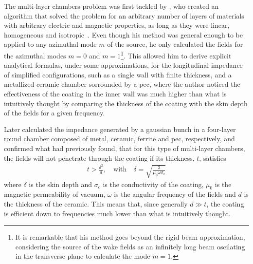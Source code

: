     The multi-layer chambers problem was first tackled by , who created an algorithm that solved the problem for an arbitrary number of layers of materials with arbitrary electric and magnetic properties, as long as they were linear, homogeneous and isotropic~\cite{Zotter1969,Zotter1969a,Zotter1970}. Even though his method was general enough to be applied to any azimuthal mode $m$ of the source, he only calculated the fields for the azimuthal modes $m=0$ and $m=1$\footnote{It is remarkable that his method goes beyond the rigid beam approximation, considering the source of the wake fields as an infinitely long beam oscilating in the transverse plane to calculate the mode $m=1$.}. This allowed him to derive explicit analytical formulas, under some approximations, for the longitudinal impedance of simplified configurations, such as a single wall with finite thickness, and a metallized ceramic chamber sorrounded by a \gls{pec}, where the author noticed the effectiveness of the coating in the inner wall was much higher than what is intuitively thought by comparing the thickness of the coating with the skin depth of the fields for a given frequency.

    Later  calculated the impedance generated by a gaussian bunch in a four-layer round chamber composed of metal, ceramic, ferrite and \gls{pec}, respectively, and confirmed what  had previously found, that for this type of multi-layer chambers, the fields will not penetrate through the coating if its thickness, $t$, satisfies
    \begin{align}
        t > \frac{\delta^2}{d}, \quad\text{with}\quad
        \delta = \sqrt{\frac{2}{\mu_0\omega\sigma_c}}
    \end{align}
    where $\delta$ is the skin depth and $\sigma_c$ is the conductivity of the coating, $\mu_0$ is the magnetic permeability of vacuum, $\omega$ is the angular frequency of the fields and $d$ is the thickness of the ceramic. This means that, since generally $d\gg t$, the coating is efficient down to frequencies much lower than what is intuitively thought.

